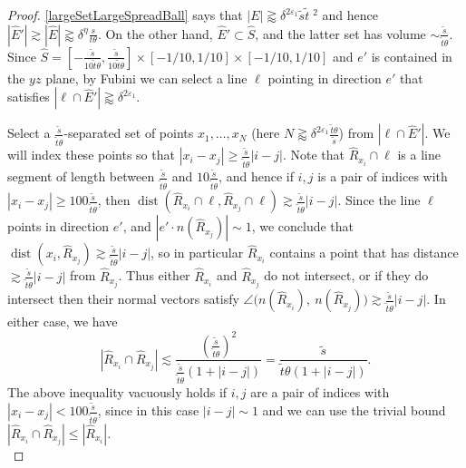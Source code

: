 \documentclass[letterpaper, reqno,11pt]{article}
\numberwithin{equation}{section}
\newcommand{\eps}{\varepsilon}
\numberwithin{thm}{section}
\theoremstyle{remark}
\begin{document}
\begin{proof}
\eqref{largeSetLargeSpreadBall} says that $|E|\gtrapprox \delta^{2\eps_1}\tilde s\tilde t\phantom{.}^2$ and hence $|\hat E'|\gtrsim |\hat E|\gtrapprox \delta^{\eta}\frac{s}{t\theta}$. On the other hand, $\hat E'\subset \hat S$, and the latter set has volume $\sim \frac{\tilde s}{\tilde t\theta}$. Since $\hat S=[-\frac{\tilde s}{10\tilde t\theta},\frac{\tilde s}{10\tilde t\theta}]\times[-1/10,1/10]\times[-1/10,1/10]$ and $e'$ is contained in the $yz$ plane, by Fubini we can select a line $\ell$ pointing in direction $e'$ that satisfies $|\ell\cap \hat E'|\gtrapprox \delta^{2\eps_1}$. 

Select a $\frac{\tilde s}{\tilde t\theta}$-separated set of points $x_1,\ldots,x_N$ (here $N\gtrapprox\delta^{2\eps_1}\frac{\tilde t\theta}{\tilde s}$)  from $|\ell\cap \hat E'|$. We will index these points so that $|x_i-x_j|\geq \frac{\tilde s}{\tilde t\theta}|i-j|$. Note that $\hat R_{x_i}\cap\ell$ is a line segment of length between $\frac{\tilde s}{\tilde t\theta}$ and $10\frac{\tilde s}{\tilde t\theta}$, and hence if $i,j$ is a pair of indices with $|x_i-x_j|\geq 100\frac{\tilde s}{\tilde t\theta}$, then $\operatorname{dist}(\hat R_{x_i}\cap\ell, \hat R_{x_j}\cap\ell)\gtrsim \frac{\tilde s}{\tilde t\theta}|i-j|$. Since the line $\ell$ points in direction $e'$, and $|e'\cdot  n(\hat R_{x_j})|\sim 1$, we conclude that $\operatorname{dist}(x_i, \hat R_{x_j})\gtrsim \frac{\tilde s}{\tilde t\theta}|i-j|$, so in particular $\hat R_{x_i}$ contains a point that has distance $\gtrsim \frac{\tilde s}{\tilde t\theta}|i-j|$ from $\hat R_{x_j}$. Thus either $\hat R_{x_i}$ and $\hat R_{x_j}$ do not intersect, or if they do intersect then their normal vectors satisfy $\angle\big( n(\hat R_{x_i}),\ n(\hat R_{x_j})\big)\gtrsim \frac{\tilde s}{\tilde t\theta}|i-j|.$ In either case, we have
\begin{equation}\label{rectangleIntersectionBdSize}
|\hat R_{x_i}\cap \hat R_{x_j}|\lesssim \frac{(\frac{\tilde s}{\tilde t\theta})^2}{\frac{\tilde s}{\tilde t\theta}(1+|i-j|)}=\frac{\tilde s}{\tilde t\theta(1+|i-j|)}.
\end{equation}
The above inequality vacuously holds if $i,j$ are a pair of indices with $|x_i-x_j|< 100\frac{\tilde s}{\tilde t\theta}$, since in this case $|i-j|\sim 1$ and we can use the trivial bound $|\hat R_{x_i}\cap \hat R_{x_j}|\leq |\hat R_{x_i}|$.\\



\end{proof}
\end{document}
